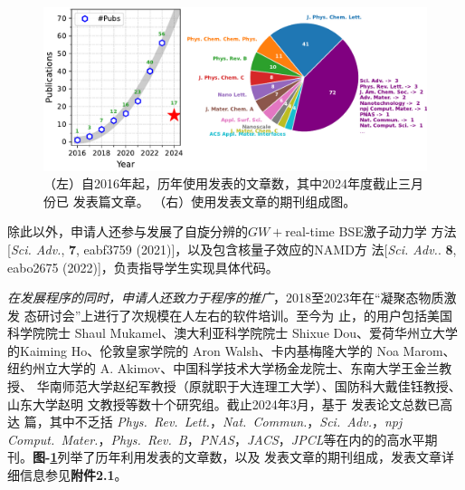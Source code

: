 
\begin{figure}
  \centering
  \includegraphics[width=1.0\linewidth]{figs/hefei-namd_pub_v3.pdf}
  \caption{\label{fig:hnamd_pub_list}
    \kaishu{}%
    （左）自2016年起，历年使用\hnamd{}发表的文章数，其中2024年度截止三月份已
    发表篇文章。
    （右）使用\hnamd{}发表文章的期刊组成图。
  }
\end{figure}

\noindent{}除此以外，申请人还参与发展了自旋分辨的$GW{}+{}$real-time BSE激子动力学
方法[\textit{Sci. Adv.}, \textbf{7}, eabf3759 (2021)]，以及包含核量子效应的NAMD方
法[\textit{Sci. Adv.}. \textbf{8}, eabo2675 (2022)]，负责指导学生实现具体代码。

\emph{在发展程序的同时，申请人还致力于程序的推广}，2018至2023年在“凝聚态物质激发
态研讨会”上进行了次规模在人左右的软件培训。至今为
止，\hnamd{}的用户包括美国科学院院士 Shaul Mukamel、澳大利亚科学院院士 Shixue
Dou、爱荷华州立大学的Kaiming Ho、伦敦皇家学院的 Aron Walsh、卡内基梅隆大学的 Noa
Marom、纽约州立大学的 A. Akimov、中国科学技术大学杨金龙院士、东南大学王金兰教授、
华南师范大学赵纪军教授（原就职于大连理工大学）、国防科大戴佳钰教授、山东大学赵明
文教授等数十个研究组。截止2024年3月，基于 \hnamd{} 发表论文总数已高
达  篇，其中不乏括 \textit{Phys.\ Rev.\ Lett.}，\textit{Nat.\
  Commun.}，\textit{Sci.\ Adv.}，\textit{npj Comput.\ Mater.}，\textit{Phys.\
  Rev.\ B}，\textit{PNAS}，\textit{JACS}，\textit{JPCL}等在内的的高水平期
刊。\textbf{图-\ref{fig:hnamd_pub_list}}列举了历年利用\hnamd{}发表的文章数，以及
发表文章的期刊组成，发表文章详细信息参见\textbf{附件2.1}。
  

